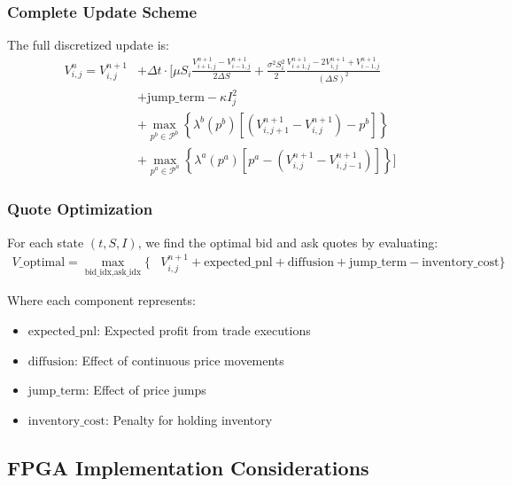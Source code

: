 \documentclass[twocolumn,ieee]{arithmaxresearch}
\begin{document}
\begin{onecolumn}
\subsubsection{Complete Update Scheme}
The full discretized update is:
\begin{equation}
\begin{aligned}
V^n_{i,j} = V^{n+1}_{i,j} &+ \Delta t \cdot \Bigg[\mu S_i \frac{V^{n+1}_{i+1,j} - V^{n+1}_{i-1,j}}{2\Delta S} + \frac{\sigma^2 S_i^2}{2}\frac{V^{n+1}_{i+1,j} - 2V^{n+1}_{i,j} + V^{n+1}_{i-1,j}}{(\Delta S)^2} \\
&+ \text{jump\_term} - \kappa I_j^2 \\
&+ \max_{p^b \in \mathcal{P}^b} \left\{\lambda^b(p^b) \left[(V^{n+1}_{i,j+1} - V^{n+1}_{i,j}) - p^b\right]\right\} \\
&+ \max_{p^a \in \mathcal{P}^a} \left\{\lambda^a(p^a) \left[p^a - (V^{n+1}_{i,j} - V^{n+1}_{i,j-1})\right]\right\}\Bigg]
\end{aligned}
\end{equation}

\subsubsection{Quote Optimization}
For each state $(t, S, I)$, we find the optimal bid and ask quotes by evaluating:
\begin{equation}
\begin{aligned}
V\_\text{optimal} = \max_{\text{bid\_idx}, \text{ask\_idx}} \Bigg\{ &V^{n+1}_{i,j} + \text{expected\_pnl} + \text{diffusion} + \text{jump\_term} - \text{inventory\_cost}\Bigg\}
\end{aligned}
\end{equation}

Where each component represents:
\begin{itemize}
    \item $\text{expected\_pnl}$: Expected profit from trade executions
    \item $\text{diffusion}$: Effect of continuous price movements
    \item $\text{jump\_term}$: Effect of price jumps
    \item $\text{inventory\_cost}$: Penalty for holding inventory
\end{itemize}

\subsection{FPGA Implementation Considerations}


\end{onecolumn}
\end{document}
